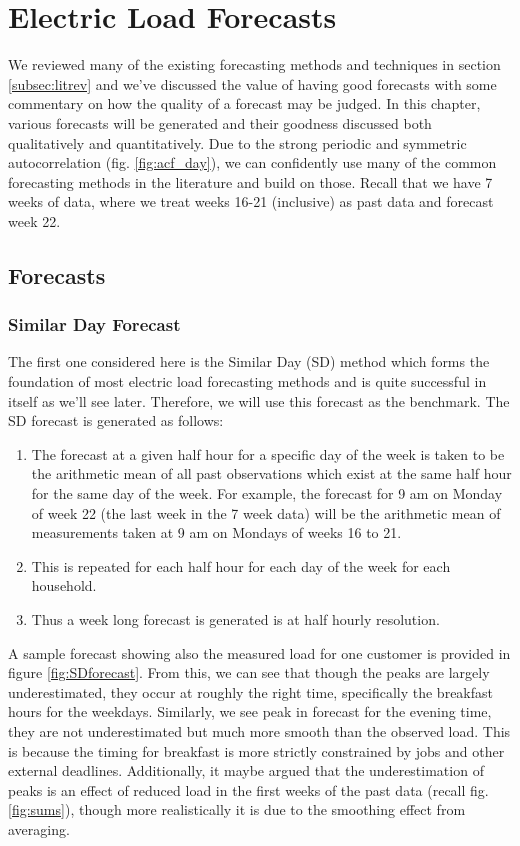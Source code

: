 
\chapter{Electric Load Forecasts}
We reviewed many of the existing forecasting methods and techniques in section \ref{subsec:litrev} and we've discussed the value of having good forecasts with some commentary on how the quality of a forecast may be judged. In this chapter, various forecasts will be generated and their goodness discussed both qualitatively and quantitatively. Due to the strong periodic and symmetric autocorrelation (fig. \ref{fig:acf_day}), we can confidently use many of the common forecasting methods in the literature and build on those. Recall that we have 7 weeks of data, where we treat weeks 16-21 (inclusive) as past data and forecast week 22.

\section{Forecasts} \label{subsec:forecasts}

\subsection{Similar Day Forecast}

The first one considered here is the Similar Day (SD) method which forms the foundation of most electric load forecasting methods and is quite successful in itself as we'll see later. Therefore, we will use this forecast as the benchmark. The SD forecast is generated as follows:
\begin{enumerate}
\item The forecast at a given half hour for a specific day of the week is taken to be the arithmetic mean of all past observations which exist at the same half hour for the same day of the week. For example, the forecast for 9 am on Monday of week 22 (the last week in the 7 week data) will be the arithmetic mean of measurements taken at 9 am on Mondays of weeks 16 to 21.
\item This is repeated for each half hour for each day of the week for each household.
\item Thus a week long forecast is generated is at half hourly resolution.
\end{enumerate}

A sample forecast showing also the measured load for one customer is provided in figure \ref{fig:SDforecast}. From this, we can see that though the peaks are largely underestimated, they occur at roughly the right time, specifically the breakfast hours for the weekdays. Similarly, we see peak in forecast for the evening time, they are not underestimated but much more smooth than the observed load. This is because the timing for breakfast is more strictly constrained by jobs and other external deadlines. Additionally, it maybe argued that the underestimation of peaks is an effect of reduced load in the first weeks of the past data (recall fig. \ref{fig:sums}), though more realistically it is due to the smoothing effect from averaging.


